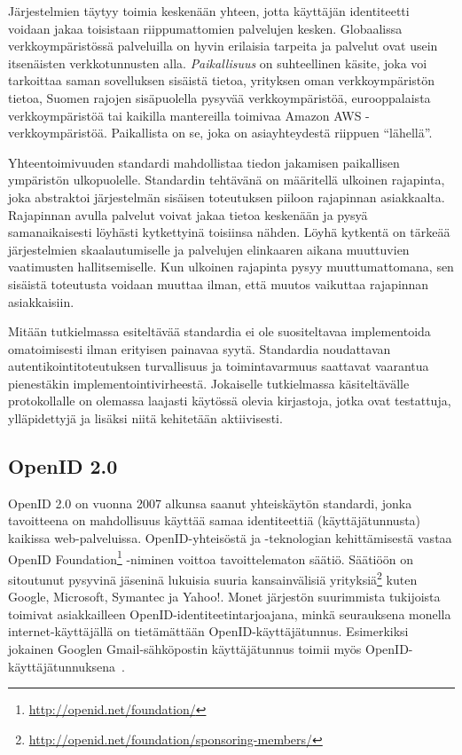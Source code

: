\documentclass[finnish,gradu]{tktltiki}
\begin{document}
  Järjestelmien täytyy toimia keskenään yhteen, jotta käyttäjän identiteetti voidaan jakaa toisistaan riippumattomien palvelujen kesken. Globaalissa verkkoympäristössä palveluilla on hyvin erilaisia tarpeita ja palvelut ovat usein itsenäisten verkkotunnusten alla. \emph{Paikallisuus} on suhteellinen käsite, joka voi tarkoittaa saman sovelluksen sisäistä tietoa, yrityksen oman verkkoympäristön tietoa, Suomen rajojen sisäpuolella pysyvää verkkoympäristöä, eurooppalaista verkkoympäristöä tai kaikilla mantereilla toimivaa Amazon AWS -verkkoympäristöä. Paikallista on se, joka on asiayhteydestä riippuen ``lähellä''.

  Yhteentoimivuuden standardi mahdollistaa tiedon jakamisen paikallisen ympäristön ulkopuolelle. Standardin tehtävänä on määritellä ulkoinen rajapinta, joka abstraktoi järjestelmän sisäisen toteutuksen piiloon rajapinnan asiakkaalta. Rajapinnan avulla palvelut voivat jakaa tietoa keskenään ja pysyä samanaikaisesti löyhästi kytkettyinä toisiinsa nähden. Löyhä kytkentä on tärkeää järjestelmien skaalautumiselle ja palvelujen elinkaaren aikana muuttuvien vaatimusten hallitsemiselle. Kun ulkoinen rajapinta pysyy muuttumattomana, sen sisäistä toteutusta voidaan muuttaa ilman, että muutos vaikuttaa rajapinnan asiakkaisiin.

  Mitään tutkielmassa esiteltävää standardia ei ole suositeltavaa implementoida omatoimisesti ilman erityisen painavaa syytä. Standardia noudattavan autentikointitoteutuksen turvallisuus ja toimintavarmuus saattavat vaarantua pienestäkin implementointivirheestä. Jokaiselle tutkielmassa käsiteltävälle protokollalle on olemassa laajasti käytössä olevia kirjastoja, jotka ovat testattuja, ylläpidettyjä ja lisäksi niitä kehitetään aktiivisesti.



  \newpage
  \subsection{OpenID 2.0} %
  \label{sub:openid}


  OpenID 2.0 on vuonna 2007 alkunsa saanut yhteiskäytön standardi, jonka tavoitteena on mahdollisuus käyttää samaa identiteettiä (käyttäjätunnusta) kaikissa web-palveluissa. OpenID-yhteisöstä ja -teknologian kehittämisestä vastaa OpenID Foundation\footnote{\url{http://openid.net/foundation/}} -niminen voittoa tavoittelematon säätiö. Säätiöön on sitoutunut pysyvinä jäseninä lukuisia suuria kansainvälisiä yrityksiä\footnote{\url{http://openid.net/foundation/sponsoring-members/}} kuten Google, Microsoft, Symantec ja Yahoo!. Monet järjestön suurimmista tukijoista toimivat asiakkailleen OpenID-identiteetintarjoajana, minkä seurauksena monella internet-käyttäjällä on tietämättään OpenID-käyttäjätunnus. Esimerkiksi jokainen Googlen Gmail-sähköpostin käyttäjätunnus toimii myös OpenID-käyttäjätunnuksena~\cite{google_openid_dev_docs}.
\end{document}
